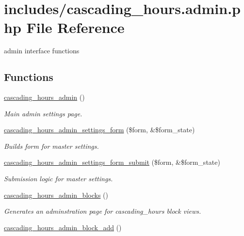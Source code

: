 \hypertarget{cascading__hours_8admin_8php}{}\section{includes/cascading\+\_\+hours.admin.\+php File Reference}
\label{cascading__hours_8admin_8php}


admin interface functions  


\subsection*{Functions}
\begin{DoxyCompactItemize}
\item 
\hyperlink{cascading__hours_8admin_8php_a39655536836b429509b1c94d19161d3c_a39655536836b429509b1c94d19161d3c}{cascading\+\_\+hours\+\_\+admin} ()
\begin{DoxyCompactList}\small\item\em Main admin settings page. \end{DoxyCompactList}\item 
\hyperlink{cascading__hours_8admin_8php_a7f3e9e97d9422b74476750a426bfc962_a7f3e9e97d9422b74476750a426bfc962}{cascading\+\_\+hours\+\_\+admin\+\_\+settings\+\_\+form} (\$form, \&\$form\+\_\+state)
\begin{DoxyCompactList}\small\item\em Builds form for master settings. \end{DoxyCompactList}\item 
\hyperlink{cascading__hours_8admin_8php_af1962325c52249d351714654fbeeaaa5_af1962325c52249d351714654fbeeaaa5}{cascading\+\_\+hours\+\_\+admin\+\_\+settings\+\_\+form\+\_\+submit} (\$form, \&\$form\+\_\+state)
\begin{DoxyCompactList}\small\item\em Submission logic for master settings. \end{DoxyCompactList}\item 
\hyperlink{cascading__hours_8admin_8php_a49a78221893cead08b78ff5e46675cd9_a49a78221893cead08b78ff5e46675cd9}{cascading\+\_\+hours\+\_\+admin\+\_\+blocks} ()
\begin{DoxyCompactList}\small\item\em Generates an adminstration page for cascading\+\_\+hours block views. \end{DoxyCompactList}\item 
\hyperlink{cascading__hours_8admin_8php_a0d64f6bf9eb2692725c9590191a55c03_a0d64f6bf9eb2692725c9590191a55c03}{cascading\+\_\+hours\+\_\+admin\+\_\+block\+\_\+add} ()

\end{DoxyCompactItemize}
